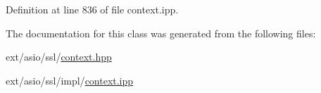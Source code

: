 Definition at line 836 of file context.\+ipp.



The documentation for this class was generated from the following files\+:\begin{DoxyCompactItemize}
\item 
ext/asio/ssl/\hyperlink{context_8hpp}{context.\+hpp}\item 
ext/asio/ssl/impl/\hyperlink{context_8ipp}{context.\+ipp}\end{DoxyCompactItemize}
